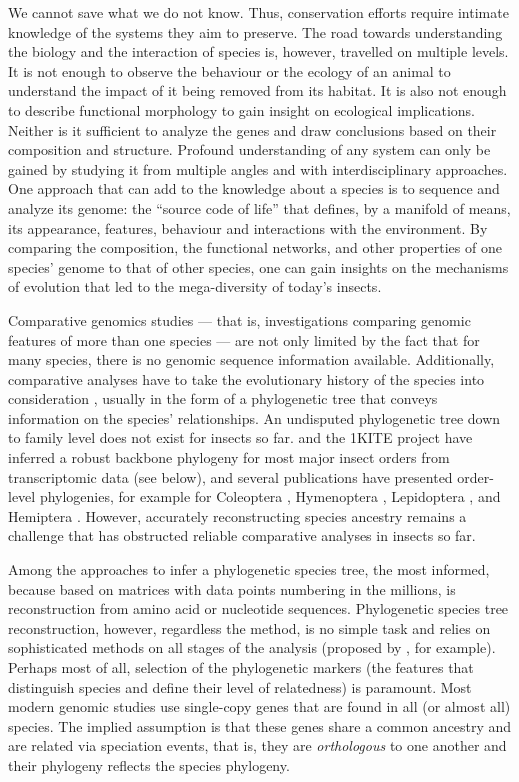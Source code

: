 We cannot save what we do not know.  Thus, conservation efforts require
intimate knowledge of the systems they aim to preserve.  The road towards
understanding the biology and the interaction of species is, however,
travelled on multiple levels.  It is not enough to observe the behaviour
or the ecology of an animal to understand the impact of it being removed
from its habitat.  It is also not enough to describe functional
morphology to gain insight on ecological implications.  Neither is it
sufficient to analyze the genes and draw conclusions based on their
composition and structure.  Profound understanding of any system can only
be gained by studying it from multiple angles and with interdisciplinary
approaches.  One approach that can add to the knowledge about a species
is to sequence and analyze its genome: the ``source code of life'' that
defines, by a manifold of means, its appearance, features, behaviour and
interactions with the environment.  By comparing the composition, the
functional networks, and other properties of one species' genome to that
of other species, one can gain insights on the mechanisms of evolution
that led to the mega-diversity of today's insects.

Comparative genomics studies --- that is, investigations comparing
genomic features of more than one species --- are not only limited by
the fact that for many species, there is no genomic sequence information
available.  Additionally, comparative analyses have to take the
evolutionary history of the species into consideration \citep{Dunn2018},
usually in the form of a phylogenetic tree that conveys information on
the species' relationships.  An undisputed phylogenetic tree down to
family level does not exist for insects so far.  \citet{Misof2014} and
the 1KITE project \citep{1KITE2018} have inferred a robust backbone
phylogeny for most major insect orders from transcriptomic data (see
below), and several publications have presented order-level phylogenies,
for example for Coleoptera \citep{McKenna2015}, Hymenoptera
\citep{Peters2017, Branstetter2017}, Lepidoptera \citep{Breinholt2018},
and Hemiptera \citep{Johnson2018}.  However, accurately reconstructing
species ancestry remains a challenge that has obstructed reliable
comparative analyses in insects so far.

Among the approaches to infer a phylogenetic species tree, the most
informed, because based on matrices with data points numbering in the
millions, is reconstruction from amino acid or nucleotide sequences.
Phylogenetic species tree reconstruction, however, regardless the
method, is no simple task and relies on sophisticated methods on all
stages of the analysis (proposed by \citet{Misof2014}, for example).
Perhaps most of all, selection of the phylogenetic markers (the features
that distinguish species and define their level of relatedness) is
paramount.   Most modern genomic studies use single-copy genes that are
found in all (or almost all) species.  The implied assumption is that
these genes share a common ancestry and are related via speciation
events, that is, they are \emph{orthologous} to one another
\citep{Koonin2005} and their phylogeny reflects the species phylogeny.

